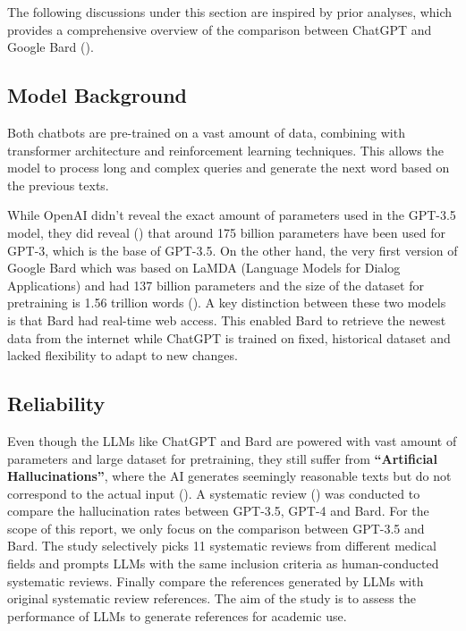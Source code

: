 The following discussions under this section are inspired by prior analyses, which provides a comprehensive overview of the comparison between ChatGPT and Google Bard (\cite{Ahmed2024}).

\subsection{Model Background}

Both chatbots are pre-trained on a vast amount of data, combining with transformer architecture and reinforcement learning techniques. This allows the model to process long and complex queries and generate the next word based on the previous texts.

While OpenAI didn't reveal the exact amount of parameters used in the GPT-3.5 model, they did reveal (\cite{Brown2020}) that around 175 billion parameters have been used for GPT-3, which is the base of GPT-3.5. On the other hand, the very first version of Google Bard which was based on LaMDA (Language Models for Dialog Applications) and had 137 billion parameters and the size of the dataset for pretraining is 1.56 trillion words (\cite{Thoppilan2022}). A key distinction between these two models is that Bard had real-time web access. This enabled Bard to retrieve the newest data from the internet while ChatGPT is trained on fixed, historical dataset and lacked flexibility to adapt to new changes.

\subsection{Reliability}

Even though the LLMs like ChatGPT and Bard are powered with vast amount of parameters and large dataset for pretraining, they still suffer from \textbf{``Artificial Hallucinations''}, where the AI generates seemingly reasonable texts but do not correspond to the actual input (\cite{Alkaissi2023}). A systematic review (\cite{Chelli2024}) was conducted to compare the hallucination rates between GPT-3.5, GPT-4 and Bard. For the scope of this report, we only focus on the comparison between GPT-3.5 and Bard. The study selectively picks 11 systematic reviews from different medical fields and prompts LLMs with the same inclusion criteria as human-conducted systematic reviews. Finally compare the references generated by LLMs with original systematic review references. The aim of the study is to assess the performance of LLMs to generate references for academic use.

